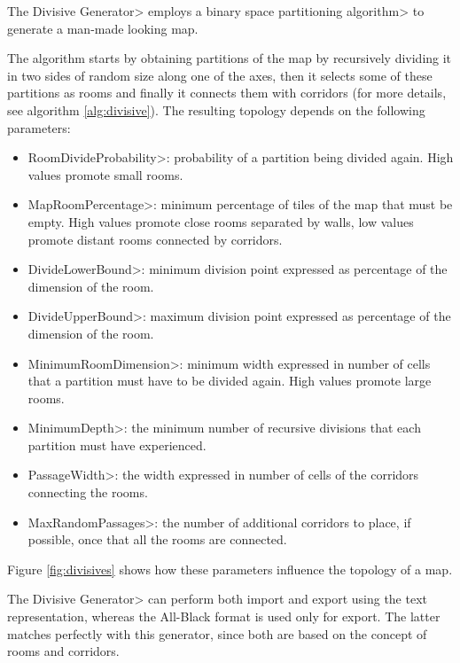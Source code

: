 The \<Divisive Generator> employs a \<binary space partitioning algorithm> to generate a man-made looking map.

\par

The algorithm starts by obtaining partitions of the map by recursively dividing it in two sides of random size along one of the axes, then it selects some of these partitions as rooms and finally it connects them with corridors (for more details, see algorithm \ref{alg:divisive}). The resulting topology depends on the following parameters:

\begin{itemize}
\item \<RoomDivideProbability>: probability of a partition being divided again. High values promote small rooms.
\item \<MapRoomPercentage>: minimum percentage of tiles of the map that must be empty. High values promote close rooms separated by walls, low values promote distant rooms connected by corridors.
\item \<DivideLowerBound>: minimum division point expressed as percentage of the dimension of the room.
\item \<DivideUpperBound>: maximum division point expressed as percentage of the dimension of the room.
\item \<MinimumRoomDimension>: minimum width expressed in number of cells that a partition must have to be divided again. High values promote large rooms.
\item \<MinimumDepth>: the minimum number of recursive divisions that each partition must have experienced.
\item \<PassageWidth>: the width expressed in number of cells of the corridors connecting the rooms.
\item \<MaxRandomPassages>: the number of additional corridors to place, if possible, once that all the rooms are connected.
\end{itemize}

\noindent Figure \ref{fig:divisives} shows how these parameters influence the topology of a map.

\par

The \<Divisive Generator> can perform both import and export using the text representation, whereas the All-Black format is used only for export. The latter matches perfectly with this generator, since both are based on the concept of rooms and corridors.

